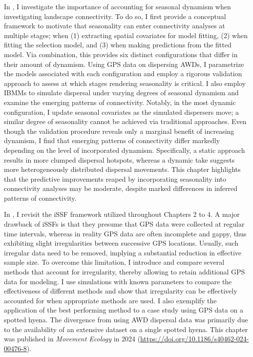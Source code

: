 \documentclass[../FinalThesis.tex]{subfiles}
\begin{document}
In , I investigate the importance of accounting for
seasonal dynamism when investigating landscape connectivity. To do so, I first
provide a conceptual framework to motivate that seasonality can enter
connectivity analyses at multiple stages; when (1) extracting spatial covariates
for model fitting, (2) when fitting the selection model, and (3) when making
predictions from the fitted model. Via combination, this provides six distinct
configurations that differ in their amount of dynamism. Using GPS data on
dispersing AWDs, I parametrize the models associated with each configuration and
employ a rigorous validation approach to assess at which stages rendering
seasonality is critical. I also employ IBMMs to simulate dispersal under varying
degrees of seasonal dynamism and examine the emerging patterns of connectivity.
Notably, in the most dynamic configuration, I update seasonal covariates as the
simulated dispersers move; a similar degree of seasonality cannot be achieved
via traditional approaches. Even though the validation procedure reveals only a
marginal benefit of increasing dynamism, I find that emerging patterns of
connectivity differ markedly depending on the level of incorporated dynamism.
Specifically, a static approach results in more clumped dispersal hotspots,
whereas a dynamic take suggests more heterogeneously distributed dispersal
movements. This chapter highlights that the predictive improvements reaped by
incorporating seasonality into connectivity analyses may be moderate, despite
marked differences in inferred patterns of connectivity.

In , I revisit the iSSF framework utilized throughout
Chapters 2 to 4. A major drawback of iSSFs is that they presume that GPS data
were collected at regular time intervals, whereas in reality GPS data are often
incomplete and gappy, thus exhibiting slight irregularities between successive
GPS locations. Usually, such irregular data need to be removed, implying a
substantial reduction in effective sample size. To overcome this limitation, I
introduce and compare several methods that account for irregularity, thereby
allowing to retain additional GPS data for modeling. I use simulations with
known parameters to compare the effectiveness of different methods and show that
irregularity can be effectively accounted for when appropriate methods are used.
I also exemplify the application of the best performing method to a case study
using GPS data on a spotted hyena. The divergence from using AWD dispersal data
was primarily due to the availability of an extensive dataset on a single
spotted hyena. This chapter was published in \textit{Movement Ecology} in 2024
(\url{https://doi.org/10.1186/s40462-024-00476-8}).
\end{document}
